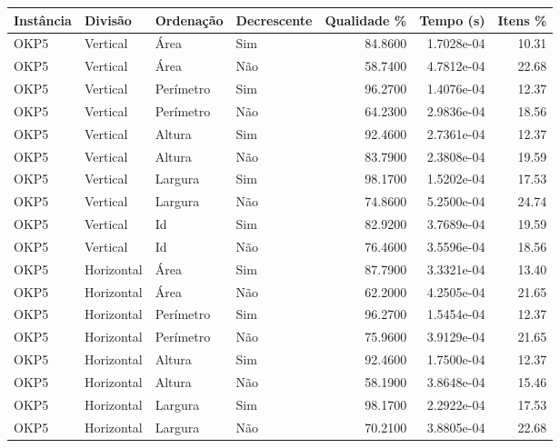 \begin{tabular}{llllrrr}
    \hline
    Instância & Divisão     & Ordenação & Decrescente & Qualidade \% & Tempo (s)  & Itens \% \\
    \hline
    OKP5      & Vertical    & Área      & Sim         & 84.8600      & 1.7028e-04 & 10.31    \\
    OKP5      & Vertical    & Área      & Não         & 58.7400      & 4.7812e-04 & 22.68    \\
    OKP5      & Vertical    & Perímetro & Sim         & 96.2700      & 1.4076e-04 & 12.37    \\
    OKP5      & Vertical    & Perímetro & Não         & 64.2300      & 2.9836e-04 & 18.56    \\
    OKP5      & Vertical    & Altura    & Sim         & 92.4600      & 2.7361e-04 & 12.37    \\
    OKP5      & Vertical    & Altura    & Não         & 83.7900      & 2.3808e-04 & 19.59    \\
    OKP5      & Vertical    & Largura   & Sim         & 98.1700      & 1.5202e-04 & 17.53    \\
    OKP5      & Vertical    & Largura   & Não         & 74.8600      & 5.2500e-04 & 24.74    \\
    OKP5      & Vertical    & Id        & Sim         & 82.9200      & 3.7689e-04 & 19.59    \\
    OKP5      & Vertical    & Id        & Não         & 76.4600      & 3.5596e-04 & 18.56    \\
    OKP5      & Horizontal  & Área      & Sim         & 87.7900      & 3.3321e-04 & 13.40    \\
    OKP5      & Horizontal  & Área      & Não         & 62.2000      & 4.2505e-04 & 21.65    \\
    OKP5      & Horizontal  & Perímetro & Sim         & 96.2700      & 1.5454e-04 & 12.37    \\
    OKP5      & Horizontal  & Perímetro & Não         & 75.9600      & 3.9129e-04 & 21.65    \\
    OKP5      & Horizontal  & Altura    & Sim         & 92.4600      & 1.7500e-04 & 12.37    \\
    OKP5      & Horizontal  & Altura    & Não         & 58.1900      & 3.8648e-04 & 15.46    \\
    OKP5      & Horizontal  & Largura   & Sim         & 98.1700      & 2.2922e-04 & 17.53    \\
    OKP5      & Horizontal  & Largura   & Não         & 70.2100      & 3.8805e-04 & 22.68    \\

\end{tabular}
